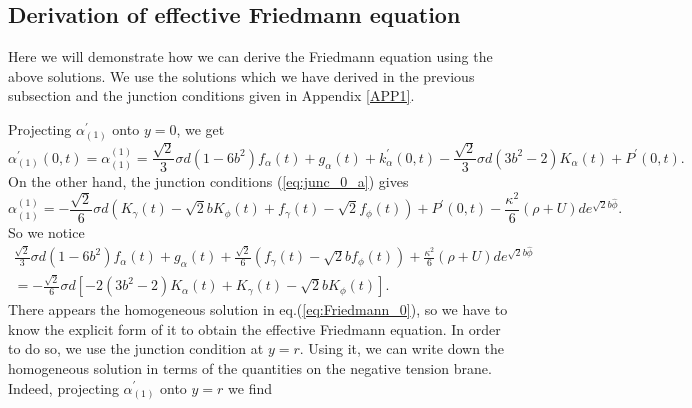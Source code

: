 \documentclass[a4paper,11pt]{article}
\begin{document}
\subsection{Derivation of effective Friedmann equation}

Here we will demonstrate how we can derive the Friedmann equation 
using the above solutions. We use the solutions which we have derived 
in the previous subsection and the junction conditions given in 
Appendix \ref{APP1}.  

Projecting $\alpha_{(1)}^{\prime}$ onto $y=0$, we get 
\begin{equation} 
\alpha_{(1)}^{\prime}(0,t) = \alpha_{(1)}^{(1)} 
=\frac{\sqrt{2}}{3}\sigma d (1-6b^2)f_{\alpha}(t)+g_{\alpha}(t)
+k_{\alpha}^{\prime}(0,t) 
- \frac{\sqrt{2}}{3}\sigma d (3b^2 -2)K_{\alpha}(t) 
+P^{\prime}(0,t). 
\end{equation}
On the other hand, the junction conditions (\ref{eq:junc_0_a}) gives  
\begin{equation}
\alpha_{(1)}^{(1)} = 
-\frac{\sqrt{2}}{6}\sigma d 
(K_{\gamma}(t)-\sqrt{2}b K_{\phi}(t) + f_{\gamma}(t) -\sqrt{2}f_{\phi}(t)) 
+P^{\prime}(0,t) 
-\frac{\kappa^2}{6}(\rho + U )d e^{\sqrt{2}b \hat{\phi}}. 
\end{equation}
So we notice  
\begin{multline}
\frac{\sqrt{2}}{3}\sigma d (1-6b^2) f_{\alpha}(t) 
+g_{\alpha}(t) 
+\frac{\sqrt{2}}{6}(f_{\gamma}(t)-\sqrt{2}b f_{\phi}(t)) 
+\frac{\kappa^2}{6}(\rho + U )d e^{\sqrt{2}b \hat{\phi}} \\
=-\frac{\sqrt{2}}{6}\sigma d 
[-2(3b^2 -2) K_{\alpha}(t)
+K_{\gamma}(t)-\sqrt{2}b K_{\phi}(t)]. 
\label{eq:Friedmann_0}
\end{multline}
There appears the homogeneous solution in eq.(\ref{eq:Friedmann_0}), 
so we have to know the explicit form of it to obtain 
the effective Friedmann equation. In order to do so, we use the junction 
condition at $y=r$.  Using it, we can write down the homogeneous 
solution in terms of the quantities on the negative tension brane. 
Indeed, projecting $\alpha_{(1)}^{\prime}$ onto $y=r$ we find 
\end{document}

